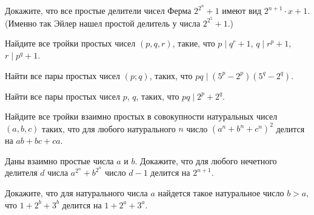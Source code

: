 \newpage

\hspace{3mm}

Докажите, что все простые делители чисел Ферма $2^{2^n}+1$ имеют вид
$2^{n+1}\cdot x+1$. (Именно так Эйлер нашел простой делитель у числа
$2^{2^5}+1$.)

Найдите все тройки простых чисел $(p,q,r)$, такие, что $p \mid q^r+1$, $q \mid r^p+1$, $r \mid p^q+1$.

Найти все пары простых чисел $(p;q)$, таких, что $pq \mid (5^p-2^p)(5^q-2^q)$.

Найти все пары простых чисел $p$, $q$, таких, что $pq \mid
2^p+2^q$.

Найдите все тройки взаимно простых в совокупности натуральных чисел $(a, b, c)$ таких, что для любого натурального $n$ число $\left(a^n+b^n+c^n\right)^2$ делится на $a b+b c+c a$.

Даны взаимно простые числа $a$ и $b$. Докажите, что для любого нечетного делителя $d$ числа $a^{2^n}+b^{2^n}$ число $d-1$ делится на $2^{n+1}$.

Докажите, что для натурального числа $a$ найдется такое натуральное число $b>a$, что $1+2^b+3^b$ делится на $1+2^a+3^a$.